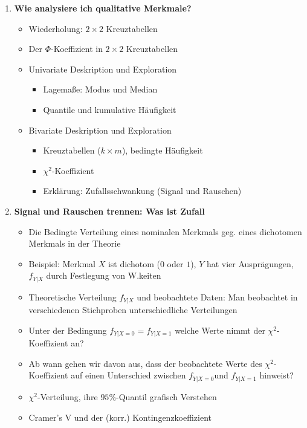 \documentclass[a4paper,fontsize=12pt]{scrartcl}
\begin{document}
\begin{enumerate}
  \item{ \textbf{Wie analysiere ich qualitative Merkmale?}
    \begin{itemize}
     \item Wiederholung: $2 \times 2$ Kreuztabellen
     \item {Der $\Phi$-Koeffizient in $2 \times 2$ Kreuztabellen}
     \item{Univariate Deskription und Exploration 
      \begin{itemize}
        \item{Lagemaße: Modus und Median}
        \item{Quantile und kumulative Häufigkeit}
      \end{itemize}
     } %
     \item{Bivariate Deskription und Exploration} %
     \begin{itemize}
        \item{Kreuztabellen ($k \times m$), bedingte Häufigkeit} %
        \item {$\chi^{2}$-Koeffizient}
        \item{Erklärung: Zufallsschwankung (Signal und Rauschen)}
      \end{itemize}
    \end{itemize}
  }
  \item{\textbf{Signal und Rauschen trennen: Was ist Zufall}
	\begin{itemize}
	 \item {Die Bedingte Verteilung eines nominalen Merkmals geg. eines dichotomen Merkmals in der Theorie}
	 \item {Beispiel: Merkmal $X$ ist dichotom ($0$ oder $1$), $Y$ hat vier Ausprägungen, $f_{Y|X}$ durch Festlegung
	 von W.keiten}
	 \item {Theoretische Verteilung $f_{Y|X}$ und beobachtete Daten: Man beobachtet in verschiedenen
	 Stichproben unterschiedliche Verteilungen}
	 \item{Unter der Bedingung $f_{Y|X=0}=f_{Y|X=1}$ welche Werte nimmt der  $\chi^{2}$-Koeffizient an?}
	 \item{Ab wann gehen wir davon aus, dass der beobachtete Werte des  $\chi^{2}$-Koeffizient auf einen
	 Unterschied zwischen $f_{Y|X=0}$und $ f_{Y|X=1}$ hinweist?}
	 \item{$\chi^{2}$-Verteilung, ihre $95\%$-Quantil grafisch Verstehen}
	 \item{Cramer's V und der (korr.) Kontingenzkoeffizient}
	\end{itemize}

}
\end{enumerate}
\end{document}
